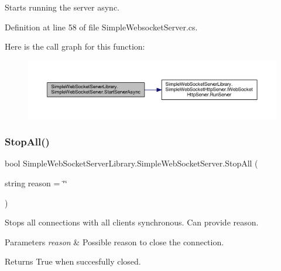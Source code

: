 Starts running the server async. 



Definition at line 58 of file Simple\+Websocket\+Server.\+cs.

Here is the call graph for this function\+:
\nopagebreak
\begin{figure}[H]
\begin{center}
\leavevmode
\includegraphics[width=350pt]{class_simple_web_socket_server_library_1_1_simple_web_socket_server_a14730d592f2fdd3278a8df1403ebd672_cgraph}
\end{center}
\end{figure}
\mbox{\label{class_simple_web_socket_server_library_1_1_simple_web_socket_server_ad80184887910735a4caa22b903ee5fd1}} 
\subsubsection{\texorpdfstring{Stop\+All()}{StopAll()}}
{\footnotesize\ttfamily bool Simple\+Web\+Socket\+Server\+Library.\+Simple\+Web\+Socket\+Server.\+Stop\+All (\begin{DoxyParamCaption}\item[{string}]{reason = {\ttfamily \char`\"{}\char`\"{}} }\end{DoxyParamCaption})}



Stops all connections with all clients synchronous. Can provide reason. 


\begin{DoxyParams}{Parameters}
{\em reason} & Possible reason to close the connection.\\
\hline
\end{DoxyParams}
\begin{DoxyReturn}{Returns}
True when succesfully closed.
\end{DoxyReturn}


